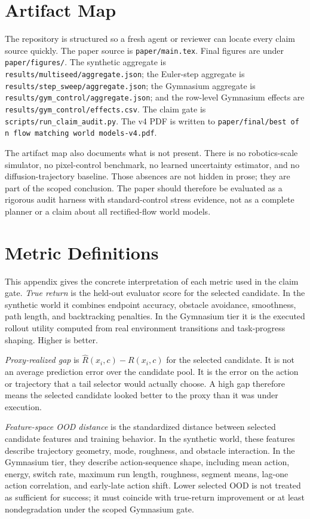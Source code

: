 \documentclass[10pt]{article}
\begin{document}
\section{Artifact Map}

The repository is structured so a fresh agent or reviewer can locate every claim source quickly. The paper source is \texttt{paper/main.tex}. Final figures are under \texttt{paper/figures/}. The synthetic aggregate is \texttt{results/multiseed/aggregate.json}; the Euler-step aggregate is \texttt{results/step\_sweep/aggregate.json}; the Gymnasium aggregate is \texttt{results/gym\_control/aggregate.json}; and the row-level Gymnasium effects are \texttt{results/gym\_control/effects.csv}. The claim gate is \texttt{scripts/run\_claim\_audit.py}. The v4 PDF is written to \texttt{paper/final/best of n flow matching world models-v4.pdf}.

The artifact map also documents what is not present. There is no robotics-scale simulator, no pixel-control benchmark, no learned uncertainty estimator, and no diffusion-trajectory baseline. Those absences are not hidden in prose; they are part of the scoped conclusion. The paper should therefore be evaluated as a rigorous audit harness with standard-control stress evidence, not as a complete planner or a claim about all rectified-flow world models.

\section{Metric Definitions}

This appendix gives the concrete interpretation of each metric used in the claim gate. \emph{True return} is the held-out evaluator score for the selected candidate. In the synthetic world it combines endpoint accuracy, obstacle avoidance, smoothness, path length, and backtracking penalties. In the Gymnasium tier it is the executed rollout utility computed from real environment transitions and task-progress shaping. Higher is better.

\emph{Proxy-realized gap} is \(\hat R(x_i,c)-R(x_i,c)\) for the selected candidate. It is not an average prediction error over the candidate pool. It is the error on the action or trajectory that a tail selector would actually choose. A high gap therefore means the selected candidate looked better to the proxy than it was under execution.

\emph{Feature-space OOD distance} is the standardized distance between selected candidate features and training behavior. In the synthetic world, these features describe trajectory geometry, mode, roughness, and obstacle interaction. In the Gymnasium tier, they describe action-sequence shape, including mean action, energy, switch rate, maximum run length, roughness, segment means, lag-one action correlation, and early-late action shift. Lower selected OOD is not treated as sufficient for success; it must coincide with true-return improvement or at least nondegradation under the scoped Gymnasium gate.
\end{document}
